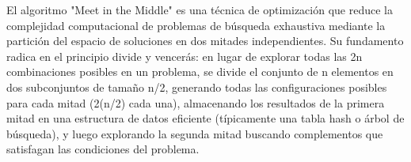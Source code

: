 \markdownRendererDocumentBegin
\markdownRendererSectionBegin
{}\markdownRendererInterblockSeparator
{}El algoritmo "Meet in the Middle" es una técnica de optimización que reduce la complejidad computacional de problemas de búsqueda exhaustiva mediante la partición del espacio de soluciones en dos mitades independientes. Su fundamento radica en el principio divide y vencerás: en lugar de explorar todas las \markdownRendererDollarSign{}2\markdownRendererCircumflex{}n\markdownRendererDollarSign{} combinaciones posibles en un problema, se divide el conjunto de n elementos en dos subconjuntos de tamaño n/2, generando todas las configuraciones posibles para cada mitad (\markdownRendererDollarSign{}2\markdownRendererCircumflex{}(n/2)\markdownRendererDollarSign{} cada una), almacenando los resultados de la primera mitad en una estructura de datos eficiente (típicamente una tabla hash o árbol de búsqueda), y luego explorando la segunda mitad buscando complementos que satisfagan las condiciones del problema.\markdownRendererInterblockSeparator
{}
\markdownRendererSectionEnd \markdownRendererDocumentEnd